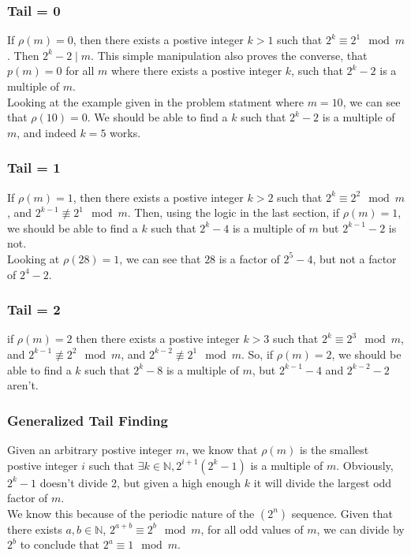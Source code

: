 \documentclass{article}
\begin{document}
  \subsubsection{Tail = 0}
  If $\rho (m) = 0$, then there exists a postive integer $k > 1$ such that $2^k \equiv 2^1 \mod m$. Then $2^k - 2 \mid m$. This simple manipulation also proves the converse, that $p(m) = 0$ for all $m$ where there exists a postive integer $k$, such that $2^k - 2$ is a multiple of $m$.\\

  Looking at the example given in the problem statment where $m=10$, we can see that $\rho(10) = 0$. We should be able to find a $k$ such that $2^k -2$ is a multiple of $m$, and indeed $k=5$ works.
  \subsubsection{Tail = 1}
  If $\rho (m) = 1$, then there exists a postive integer $k > 2$ such that $2^k \equiv 2^2 \mod m$, and $2^{k-1} \not\equiv 2^1 \mod m.$ Then, using the logic in the last section, if $\rho(m) = 1$, we should be able to find a $k$ such that $2^k - 4$ is a multiple of $m$ but $2^{k-1} - 2$ is not.\\

  Looking at $\rho(28) = 1$, we can see that $28$ is a factor of $2^5 - 4$, but not a factor of $2^4 - 2$. 
  \subsubsection{Tail = 2}
  if $\rho (m) = 2$ then there exists a postive integer $k > 3$ such that $2^k \equiv 2^3 \mod m$, and $2^{k-1} \not\equiv 2^2 \mod m$, and $2^{k-2} \not\equiv 2^1 \mod m$. So, if $\rho(m) = 2$, we should be able to find a $k$ such that $2^k - 8$ is a multiple of $m$, but $2^{k-1} - 4$ and $2^{k-2} - 2$ aren't.
  \subsubsection{Generalized Tail Finding}
  Given an arbitrary postive integer $m$, we know that $\rho(m)$ is the smallest postive integer $i$ such that $\exists k \in \mathbb{N}, 2^{i+1}(2^k - 1)$ is a multiple of $m$. Obviously, $2^k-1$ doesn't divide 2, but given a high enough $k$ it will divide the largest odd factor of $m$.\\

  We know this because of the periodic nature of the $(2^n)$ sequence. Given that there exists $a, b \in \mathbb{N}$, $2^{a+b} \equiv 2^b \mod m$, for all odd values of $m$, we can divide by $2^b$ to conclude that $2^a \equiv 1 \mod m$.\\
\end{document}
